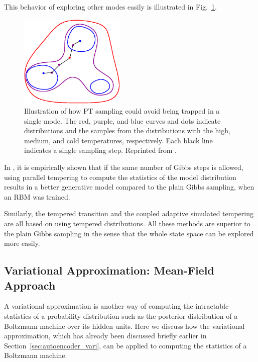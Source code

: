 \documentclass[dissertation,nocontribution]{aaltoseries}
\begin{document}
This behavior of exploring other modes easily is illustrated
in Fig.~\ref{fig:pt_escape}.

\begin{figure}[t]
    \centering
    \includegraphics[width=0.45\textwidth]{figures/pt.eps}
    \caption{Illustration of how PT sampling could avoid
    being trapped in a single mode. The red, purple, and
    blue curves and dots indicate distributions and the
    samples from the distributions with the high, medium,
    and cold temperatures, respectively. Each black line
    indicates a single sampling step. Reprinted from
    \citep{Cho2011t}.}
    \label{fig:pt_escape}
\end{figure}

In , it is empirically shown that if
the same number of Gibbs steps is allowed, using parallel
tempering to compute the statistics of the model
distribution results in a better generative model compared
to the plain Gibbs sampling, when an RBM was trained.

Similarly, the tempered transition and the
coupled adaptive simulated tempering
\citep{Salakhutdinov2010} are all based on using 
tempered distributions. All these methods are superior to
the plain Gibbs sampling in the sense that the whole state
space can be explored more easily.


\subsection{Variational Approximation: Mean-Field Approach}
\label{sec:bm_vari}

A variational approximation is another way of computing the
intractable statistics of a probability distribution such as
the posterior distribution of a Boltzmann machine over its
hidden units. Here we discuss how the variational
approximation, which has already been discussed briefly
earlier in Section~\ref{sec:autoencoder_vari}, can be
applied to computing the statistics of a Boltzmann machine.
\end{document}

